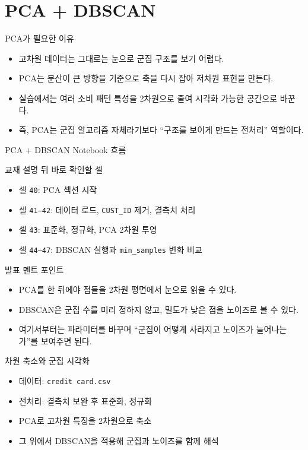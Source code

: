 \documentclass[aspectratio=169]{beamer}
\begin{document}
\section{PCA + DBSCAN}
\begin{frame}{PCA가 필요한 이유}
\begin{itemize}
    \item 고차원 데이터는 그대로는 눈으로 군집 구조를 보기 어렵다.
    \item PCA는 분산이 큰 방향을 기준으로 축을 다시 잡아 저차원 표현을 만든다.
    \item 실습에서는 여러 소비 패턴 특성을 2차원으로 줄여 시각화 가능한 공간으로 바꾼다.
    \item 즉, PCA는 군집 알고리즘 자체라기보다 ``구조를 보이게 만드는 전처리'' 역할이다.
\end{itemize}
\end{frame}

\begin{frame}{PCA + DBSCAN Notebook 흐름}
\begin{block}{교재 설명 뒤 바로 확인할 셀}
\begin{itemize}
    \item 셀 \texttt{40}: PCA 섹션 시작
    \item 셀 \texttt{41--42}: 데이터 로드, \texttt{CUST\_ID} 제거, 결측치 처리
    \item 셀 \texttt{43}: 표준화, 정규화, PCA 2차원 투영
    \item 셀 \texttt{44--47}: DBSCAN 실행과 \texttt{min\_samples} 변화 비교
\end{itemize}
\end{block}
\begin{block}{발표 멘트 포인트}
\begin{itemize}
    \item PCA를 한 뒤에야 점들을 2차원 평면에서 눈으로 읽을 수 있다.
    \item DBSCAN은 군집 수를 미리 정하지 않고, 밀도가 낮은 점을 노이즈로 볼 수 있다.
    \item 여기서부터는 파라미터를 바꾸며 ``군집이 어떻게 사라지고 노이즈가 늘어나는가''를 보여주면 된다.
\end{itemize}
\end{block}
\end{frame}

\begin{frame}{차원 축소와 군집 시각화}
\begin{itemize}
    \item 데이터: \texttt{credit card.csv}
    \item 전처리: 결측치 보완 후 표준화, 정규화
    \item PCA로 고차원 특징을 2차원으로 축소
    \item 그 위에서 DBSCAN을 적용해 군집과 노이즈를 함께 해석
\end{itemize}
\end{frame}
\end{document}
